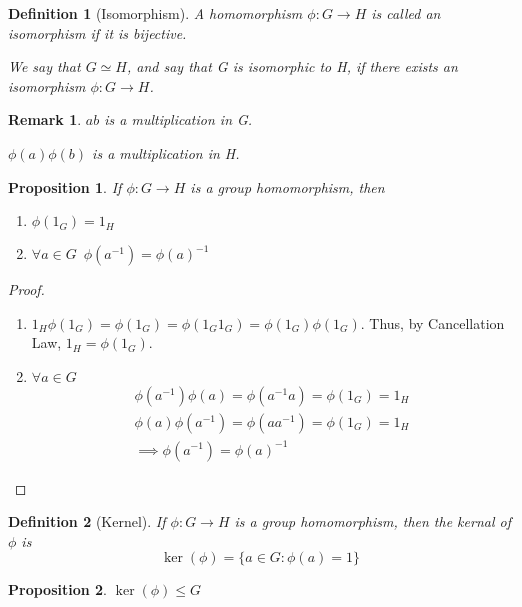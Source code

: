 \documentclass[11pt, oneside]{book}
\theoremstyle{break}
\newtheorem*{proof}{Proof}
\newtheorem{propo}{Proposition}[section]
\newtheorem*{remark}{Remark}
\newtheorem{defn}{Definition}[section]
\begin{document}
\begin{defn}[Isomorphism]
    A homomorphism $\phi: G \to H$ is called an isomorphism if it is bijective.

    We say that $G \simeq H$, and say that G is isomorphic to H, if there exists an isomorphism $\phi: G \to H$.
\end{defn}

\begin{remark}
    $ab$ is a multiplication in G.

    $\phi(a)\phi(b)$ is a multiplication in H.
\end{remark}

\begin{propo}
    If $\phi: G \to H$ is a group homomorphism, then
    \begin{enumerate}
        \item $\phi(1_G) = 1_H$
        \item $\forall a \in G \enspace \phi(a^{-1}) = \phi(a)^{-1}$
    \end{enumerate}
\end{propo}

\begin{proof}
    \begin{enumerate}
        \item $1_H \phi(1_G) = \phi(1_G) = \phi(1_G 1_G) = \phi(1_G)\phi(1_G)$.
            Thus, by Cancellation Law, $1_H = \phi(1_G)$.
        \item $\forall a \in G$
            \begin{gather*}
                \phi(a^{-1})\phi(a) = \phi(a^{-1}a) = \phi(1_G) = 1_H \\
                \phi(a)\phi(a^{-1}) = \phi(aa^{-1}) = \phi(1_G) = 1_H \\
                \implies \phi(a^{-1}) = \phi(a)^{-1}
            \end{gather*}
    \end{enumerate}
\end{proof}

\begin{defn}[Kernel]
    If $\phi: G \to H$ is a group homomorphism, then the kernal of $\phi$ is
    \begin{equation}
        \ker(\phi) = \{a \in G: \phi(a) = 1\}
    \end{equation}
\end{defn}

\begin{propo}
    $\ker(\phi) \leq G$
\end{propo}
\end{document}
